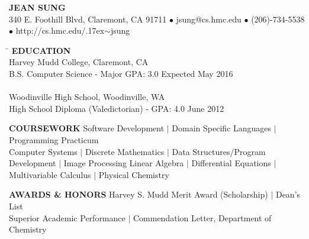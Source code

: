 \documentclass[11pt]{article}
\makeatletter
\newcommand{\selfName}{\LARGE\textbf{JEAN SUNG}}
\newcommand{\addrA}{\small 340 E. Foothill Blvd, }
\newcommand{\addrB}{\small Claremont, CA 91711}
\newcommand{\email}{\small{jsung@cs.hmc.edu}}
\newcommand{\phone}{(206)-734-5538 }
\newcommand{\tildeText}{\raise.17ex\hbox{$\scriptstyle\sim$}}
\newcommand{\website}{\small{http://cs.hmc.edu/\tildeText jsung}}
\newcommand{\headerdot}{  $\bullet$  }
\newcommand{\vb}{ $\mid$ }
\newcommand{\sectionNL}{\\[-2pt]}
\makeatother
\begin{document}
\begin{center}
\selfName \\
 \addrA \addrB \headerdot \email \headerdot \phone \headerdot \website
\end{center}

\vspace{-15pt}


\begin{tabbing}
\hspace*{6.5in}\= \kill
{\textbf{EDUCATION} } \> \sectionNL
Harvey Mudd College, Claremont, CA \> \\
B.S. Computer Science - Major GPA: 3.0   \>Expected May 2016  \\ \\


Woodinville High School, Woodinville, WA \> \\
High School Diploma (Valedictorian) - GPA: 4.0 \> June 2012
\end{tabbing}


\begin{flushleft}
{\textbf{COURSEWORK}} Software Development \vb Domain Specific Languages \vb Programming Practicum \\
Computer Systems \vb Discrete Mathematics \vb Data Structures/Program Development \vb Image Processing 
Linear Algebra \vb Differential Equations \vb Multivariable Calculus \vb Physical Chemistry\\

\end{flushleft}

\begin{flushleft}
{\textbf{AWARDS \& HONORS}} Harvey S. Mudd Merit Award (Scholarship)\vb Dean's List \\
Superior Academic Performance \vb Commendation Letter, Department of Chemistry 
\end{flushleft} 
\end{document}
